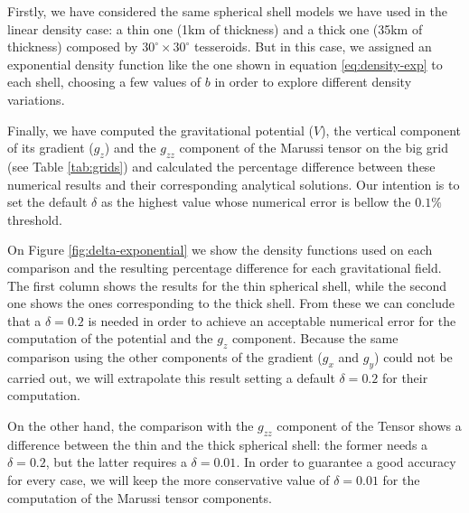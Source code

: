 \documentclass[extra]{gji}
\begin{document}
Firstly, we have considered the same spherical shell models we have 
used in the linear density case: a thin one (1km of thickness) and a 
thick one (35km of thickness) composed by $30^\circ \times 30^\circ$ 
tesseroids.
But in this case, we assigned an exponential density function like the 
one shown in equation \ref{eq:density-exp} to each shell, choosing 
a few values of $b$ in order to explore different density 
variations.

Finally, we have computed the gravitational potential ($V$), the 
vertical component of its gradient ($g_z$) and the $g_{zz}$ component of 
the Marussi tensor on the big grid (see Table \ref{tab:grids}) and 
calculated the percentage difference between these numerical results and 
their corresponding analytical solutions.
Our intention is to set the default $\delta$ as the highest value whose 
numerical error is bellow the $0.1\%$ threshold.

On Figure \ref{fig:delta-exponential} we show the density functions 
used on each comparison and the resulting percentage difference for each 
gravitational field.
The first column shows the results for the thin spherical shell, while the 
second one shows the ones corresponding to the thick shell.
From these we can conclude that a $\delta = 0.2$ is needed in order to 
achieve an acceptable numerical error for the computation of the 
potential and the $g_z$ component.
Because the same comparison using the other components of the gradient ($g_x$ 
and $g_y$) could not be carried out, we will extrapolate this result 
setting a default $\delta = 0.2$ for their computation.

On the other hand, the comparison with the $g_{zz}$ component of the 
Tensor shows a difference between the thin and the thick spherical 
shell: the former needs a $\delta = 0.2$, but the latter requires a 
$\delta = 0.01$.
In order to guarantee a good accuracy for every case, we will keep the 
more conservative value of $\delta = 0.01$ for the computation of the 
Marussi tensor components.
\end{document}
